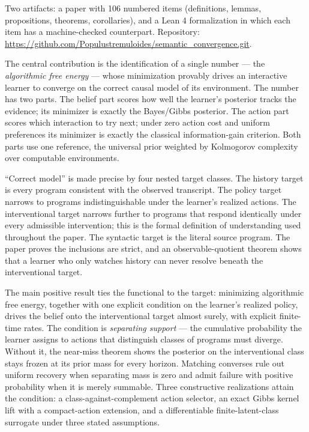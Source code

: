 \documentclass[11pt]{article}
\begin{document}
Two artifacts: a paper with 106 numbered items (definitions, lemmas, propositions, theorems, corollaries), and a Lean 4 formalization in which each item has a machine-checked counterpart. Repository: \url{https://github.com/Populustremuloides/semantic_convergence.git}.

The central contribution is the identification of a single number --- the \emph{algorithmic free energy} --- whose minimization provably drives an interactive learner to converge on the correct causal model of its environment. The number has two parts. The belief part scores how well the learner's posterior tracks the evidence; its minimizer is exactly the Bayes/Gibbs posterior. The action part scores which interaction to try next; under zero action cost and uniform preferences its minimizer is exactly the classical information-gain criterion. Both parts use one reference, the universal prior weighted by Kolmogorov complexity over computable environments.

``Correct model'' is made precise by four nested target classes. The history target is every program consistent with the observed transcript. The policy target narrows to programs indistinguishable under the learner's realized actions. The interventional target narrows further to programs that respond identically under every admissible intervention; this is the formal definition of understanding used throughout the paper. The syntactic target is the literal source program. The paper proves the inclusions are strict, and an observable-quotient theorem shows that a learner who only watches history can never resolve beneath the interventional target.

The main positive result ties the functional to the target: minimizing algorithmic free energy, together with one explicit condition on the learner's realized policy, drives the belief onto the interventional target almost surely, with explicit finite-time rates. The condition is \emph{separating support} --- the cumulative probability the learner assigns to actions that distinguish classes of programs must diverge. Without it, the near-miss theorem shows the posterior on the interventional class stays frozen at its prior mass for every horizon. Matching converses rule out uniform recovery when separating mass is zero and admit failure with positive probability when it is merely summable. Three constructive realizations attain the condition: a class-against-complement action selector, an exact Gibbs kernel lift with a compact-action extension, and a differentiable finite-latent-class surrogate under three stated assumptions.
\end{document}
